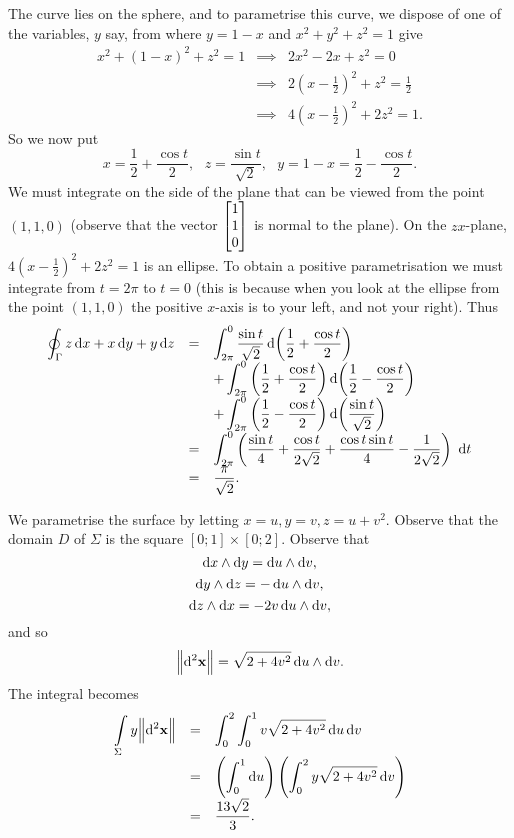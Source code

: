 \begin{Answer}{13.3}
 The
curve lies on the sphere, and to parametrise this curve, we dispose
of one of the variables, $y$ say, from where $y = 1-x$ and $x^2 +
y^2 + z^2 = 1$ give
$$\begin{array}{lll}x^2 + (1 - x)^2 + z^2 = 1  & \implies & 2x^2 -2x + z^2 = 0\\ & \implies & 2\left(x - \frac{1}{2}\right)^2   + z^2 = \frac{1}{2}\\
& \implies & 4\left(x - \frac{1}{2}\right)^2 + 2z^2 =
1.\end{array}$$ So we now put $$x = \frac{1}{2} +  \frac{\cos t}{2},
\ \ \ z = \dfrac{\sin t}{\sqrt{2}},\ \ \  y = 1 - x =
\frac{1}{2}-\frac{\cos t}{2}.
$$We must integrate on the side of the plane that can be viewed
from   the point $(1,1,0)$ (observe that the vector  $\begin{bmatrix} 1\\ 1 \\
0 \end{bmatrix}$ is normal to the plane). On the $zx$-plane, $4\left(x -
\frac{1}{2}\right)^2 + 2z^2 = 1$ is an ellipse. To obtain a positive
parametrisation we must integrate from $t = 2\pi$ to $t = 0$ (this
is because when you look at the ellipse from the point $(1,1,0)$ the
positive $x$-axis is to your left, and not your right).   Thus
$$\begin{array}{lll}\doint _\Gamma  z\d{x} + x\d{y} + y\d{z} & = &
\dint ^0 _{2\pi} \dfrac{\sin
t}{\sqrt{2}} \d{\left( \frac{1}{2} + \frac{\cos t}{2}\right)}  \\
& & + \dint ^0 _{2\pi} \left( \frac{1}{2} + \frac{\cos
t}{2}\right)\d{\left(\frac{1}{2} -\frac{\cos t}{2}\right)} \\ & & +
\dint ^0 _{2\pi} \left(\frac{1}{2} -\frac{\cos
t}{2}\right)\d{\left(\dfrac{\sin t}{\sqrt{2}}\right)} \\
& = & \dint ^0 _{2\pi} \left(\frac{\sin t}{4}+ \frac{\cos
t}{2\sqrt{2}}+ \frac{\cos t\sin t}{4}  -
\frac{1}{2\sqrt{2}}\right)\ \d{t}  \\
& = & \dfrac{\pi}{\sqrt{2}}.
\end{array}$$

\end{Answer}
\begin{Answer}{13.4}
 We parametrise the surface by letting $x = u, y =
v, z = u + v^2.$ Observe that the domain $D$ of $\Sigma$ is the
square $[0; 1]\times [0; 2]$. Observe that
$$\d{x} \wedge \d{y}
=   \d{u} \wedge \d{v} ,$$
$$\d{y} \wedge \d{z} = -\d{u} \wedge \d{v}, $$
$$\d{z} \wedge \d{x} = -2v\d{u} \wedge \d{v},
$$and so
$$\norm{\d{ ^2\vector{x}}} = \sqrt{2 + 4v^2}\d{u} \wedge \d{v}.$$
The integral becomes
$$\begin{array}{lll}
\dint \limits_\Sigma y \norm{\d{ ^2\vector{x}}} & = & \dint_0 ^2\dint _0
^1
v\sqrt{2 + 4v^2}\d{u}\d{v} \\
& = & \left(\dint_0 ^1 \d{u}\right) \left(\dint_0 ^2 y\sqrt{2 +
4v^2}\d{v}\right) \\
& = & \dfrac{13\sqrt{2}}{3}.
\end{array}$$
\end{Answer}

